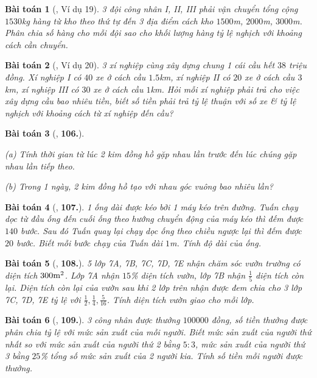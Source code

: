 \documentclass{article}
\numberwithin{equation}{section}
\newtheorem{baitoan}{Bài toán}
\begin{document}
\begin{baitoan}[\cite{Binh_Toan_7_tap_1}, Ví dụ 19]
	3 đội công nhân I, II, III phải vận chuyển tổng cộng $1530$\emph{kg} hàng từ kho theo thứ tự đến 3 địa điểm cách kho $1500$\emph{m}, $2000$\emph{m}, $3000$\emph{m}. Phân chia số hàng cho mỗi đội sao cho khối lượng hàng tỷ lệ nghịch với khoảng cách cần chuyển.
\end{baitoan}

\begin{baitoan}[\cite{Binh_Toan_7_tap_1}, Ví dụ 20]
	3 xí nghiệp cùng xây dựng chung 1 cái cầu hết $38$ triệu đồng. Xí nghiệp I có $40$ xe ở cách cầu $1.5$\emph{km}, xí nghiệp II có $20$ xe ở cách cầu $3$\emph{km}, xí nghiệp III có $30$ xe ở cách cầu $1$\emph{km}. Hỏi mỗi xí nghiệp phải trả cho việc xây dựng cầu bao nhiêu tiền, biết số tiền phải trả tỷ lệ thuận với số xe \& tỷ lệ nghịch với khoảng cách từ xí nghiệp đến cầu?
\end{baitoan}

\begin{baitoan}[\cite{Binh_Toan_7_tap_1}, \textbf{106.}]
	\begin{enumerate*}
		\item[(a)] Tính thời gian từ lúc 2 kim đồng hồ gặp nhau lần trước đến lúc chúng gặp nhau lần tiếp theo.
		\item[(b)] Trong 1 ngày, 2 kim đồng hồ tạo với nhau góc vuông bao nhiêu lần?
	\end{enumerate*}
\end{baitoan}

\begin{baitoan}[\cite{Binh_Toan_7_tap_1}, \textbf{107.}]
	1 ống dài được kéo bởi 1 máy kéo trên đường. Tuấn chạy dọc từ đầu ống đến cuối ống theo hướng chuyển động của máy kéo thì đếm được $140$ bước. Sau đó Tuấn quay lại chạy dọc ống theo chiều ngược lại thì đếm được $20$ bước. Biết mỗi bước chạy của Tuấn dài $1$\emph{m}. Tính độ dài của ống.
\end{baitoan}

\begin{baitoan}[\cite{Binh_Toan_7_tap_1}, \textbf{108.}]
	5 lớp 7A, 7B, 7C, 7D, 7E nhận chăm sóc vườn trường có diện tích $300\rm m^2$. Lớp 7A nhận $15$\% diện tích vườn, lớp 7B nhận $\frac{1}{5}$ diện tích còn lại. Diện tích còn lại của vườn sau khi 2 lớp trên nhận được đem chia cho 3 lớp 7C, 7D, 7E tỷ lệ với $\frac{1}{2},\frac{1}{4},\frac{5}{16}$. Tính diện tích vườn giao cho mỗi lớp.
\end{baitoan}

\begin{baitoan}[\cite{Binh_Toan_7_tap_1}, \textbf{109.}]
	3 công nhân được thưởng $100000$ đồng, số tiền thưởng được phân chia tỷ lệ với mức sản xuất của mỗi người. Biết mức sản xuất của người thứ nhất so với mức sản xuất của người thứ 2 bằng $5:3$, mức sản xuất của người thứ 3 bằng $25$\% tổng số mức sản xuất của 2 người kia. Tính số tiền mỗi người được thưởng.
\end{baitoan}
\end{document}
